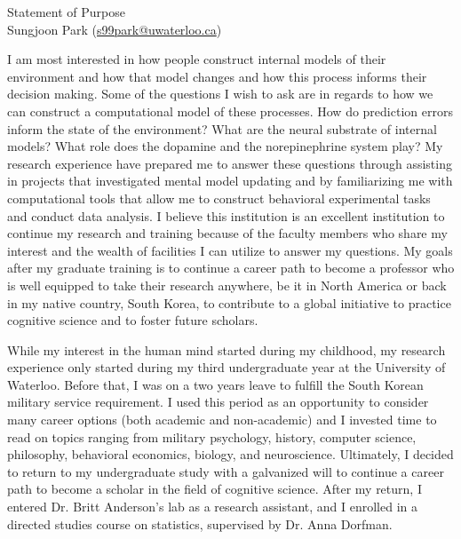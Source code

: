 \documentclass[12pt]{article}
\let\oldcenter\center
\let\oldendcenter\endcenter
\renewenvironment{center}{\setlength\topsep{-1pt}\oldcenter}{\oldendcenter}
\begin{document}
	
	\begin{center}
		{\Large Statement of Purpose} \\
		{\normalsize Sungjoon Park (\href{mailto:s99park@uwaterloo.ca}{s99park@uwaterloo.ca})}
	\end{center}
	
	I am most interested in how people construct internal models of their environment and how that model changes and how this process informs their decision making. Some of the questions I wish to ask are in regards to how we can construct a computational model of these processes. How do prediction errors inform the state of the environment? What are the neural substrate of internal models? What role does the dopamine and the norepinephrine system play? My research experience have prepared me to answer these questions through assisting in projects that investigated mental model updating and by familiarizing me with computational tools that allow me to construct behavioral experimental tasks and conduct data analysis. I believe this institution is an excellent institution to continue my research and training because of the faculty members who share my interest and the wealth of facilities I can utilize to answer my questions. My goals after my graduate training is to continue a career path to become a professor who is well equipped to take their research anywhere, be it in North America or back in my native country, South Korea, to contribute to a global initiative to practice cognitive science and to foster future scholars.
	
	While my interest in the human mind started during my childhood, my research experience only started during my third undergraduate year at the University of Waterloo. Before that, I was on a two years leave to fulfill the South Korean military service requirement. I used this period as an opportunity to consider many career options (both academic and non-academic) and I invested time to read on topics ranging from military psychology, history, computer science, philosophy, behavioral economics, biology, and neuroscience. Ultimately, I decided to return to my undergraduate study with a galvanized will to continue a career path to become a scholar in the field of cognitive science. After my return, I entered Dr. Britt Anderson’s lab as a research assistant, and I enrolled in a directed studies course on statistics, supervised by Dr. Anna Dorfman.
	
\end{document}
